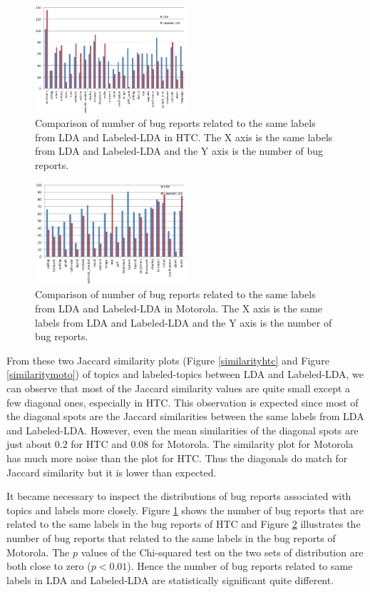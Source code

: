 \documentclass[10pt, conference, compsocconf]{IEEEtran}
\begin{document}
\begin{figure}
\centering
\includegraphics[width=0.5\textwidth]{htcldallda.png}
\caption{Comparison of number of bug reports related to the same labels from LDA and Labeled-LDA in HTC. The X axis is the same labels from LDA and Labeled-LDA and the Y axis is the number of bug reports.}
\label{bughtc}
\end{figure}

\begin{figure}
\centering
\includegraphics[width=0.5\textwidth]{motoldallda.png}
\caption{Comparison of number of bug reports related to the same labels from LDA and Labeled-LDA in Motorola. The X axis is the same labels from LDA and Labeled-LDA and the Y axis is the number of bug reports.}
\label{bugmoto}
\end{figure}


From these two Jaccard similarity plots (Figure \ref{similarityhtc}
and Figure \ref{similaritymoto}) of topics and labeled-topics between LDA and
Labeled-LDA, we can observe that most of the Jaccard similarity values
are quite small except a few diagonal ones, especially in HTC. This
observation is expected since most of the diagonal spots are the
Jaccard similarities between the same labels from LDA and
Labeled-LDA. However, even the mean similarities of the diagonal spots
are just about $0.2$ for HTC and $0.08$ for Motorola. The similarity plot
for Motorola has much more noise than the plot for HTC.
Thus the diagonals do match for Jaccard similarity but it is lower
than expected.

It became necessary to inspect the distributions of bug reports
associated with topics and labels more closely. 
Figure \ref{bughtc} shows the number of bug reports that are related to
the same labels in the bug reports of HTC and Figure \ref{bugmoto}
illustrates the number of bug reports that related to the same labels
in the bug reports of Motorola. The $ p $ values of the Chi-squared
test on the two sets of distribution are both close to zero ($p < 0.01$). Hence the
number of bug reports related to same labels in LDA and Labeled-LDA
are statistically significant quite different.
\end{document}
